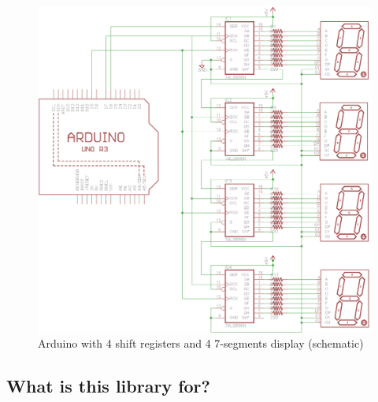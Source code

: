 \documentclass[11pt,english]{article}
\begin{document}
%
\begin{figure}[H]
\centering\includegraphics[scale=0.75]{img/4x-shift-reg}

\caption{Arduino with 4 shift registers and 4 7-segments display (schematic) \label{fig:ard-4xshift}}

\end{figure}



\subsection{What is this library for?}\label{subsec:what does}
\end{document}
